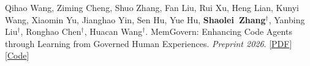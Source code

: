 \documentclass{resume}
\begin{document}
\begin{enumerate}[label={[\arabic*]},parsep=0ex]
    \item Qihao Wang, Ziming Cheng, Shuo Zhang, Fan Liu, Rui Xu, Heng Lian, Kunyi Wang, Xiaomin Yu, Jianghao Yin, Sen Hu, Yue Hu, \textbf{Shaolei\ Zhang}$^\dagger$, Yanbing Liu$^\dagger$, Ronghao Chen$^\dagger$, Huacan Wang$^\dagger$. MemGovern: Enhancing Code Agents through Learning from Governed Human Experiences. \textit{Preprint 2026}. [\href{https://arxiv.org/pdf/2601.06789}{PDF}] [\href{https://github.com/QuantaAlpha/MemGovern}{Code}]


    
    
    




    
    
\end{enumerate}
\end{document}
